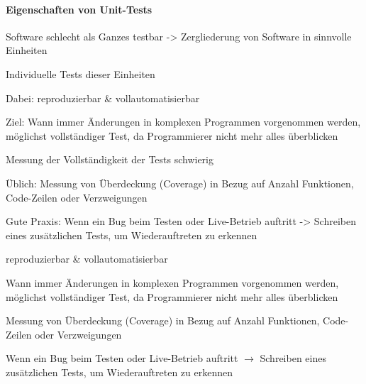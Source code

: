 \documentclass[10pt]{article}
\begin{document}
\paragraph{Eigenschaften von Unit-Tests}
\begin{itemize*}
  \item Software schlecht als Ganzes testbar -> Zergliederung von Software in sinnvolle Einheiten
  \item Individuelle Tests dieser Einheiten
  \item Dabei: reproduzierbar \& vollautomatisierbar
  \begin{itemize*}
    \item Ziel: Wann immer Änderungen in komplexen Programmen vorgenommen werden, möglichst vollständiger Test, da Programmierer nicht mehr alles überblicken
  \end{itemize*}
  \item Messung der Vollständigkeit der Tests schwierig
  \item Üblich: Messung von Überdeckung (Coverage) in Bezug auf Anzahl Funktionen, Code-Zeilen oder Verzweigungen
  \item Gute Praxis: Wenn ein Bug beim Testen oder Live-Betrieb auftritt -> Schreiben eines zusätzlichen Tests, um Wiederauftreten zu erkennen
\end{itemize*}

\begin{itemize*}
  \item reproduzierbar \& vollautomatisierbar
  \item Wann immer Änderungen in komplexen Programmen vorgenommen werden, möglichst vollständiger Test, da Programmierer nicht mehr alles überblicken
  \item Messung von Überdeckung (Coverage) in Bezug auf Anzahl Funktionen, Code-Zeilen oder Verzweigungen
  \item Wenn ein Bug beim Testen oder Live-Betrieb auftritt $\rightarrow$ Schreiben eines zusätzlichen Tests, um Wiederauftreten zu erkennen
\end{itemize*}
\end{document}
